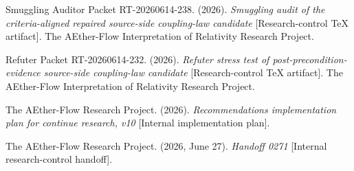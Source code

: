 \documentclass[11pt]{article}
\begin{document}
Smuggling Auditor Packet RT-20260614-238. (2026). \textit{Smuggling audit of
the criteria-aligned repaired source-side coupling-law candidate}
[Research-control TeX artifact]. The AEther-Flow Interpretation of Relativity
Research Project.

Refuter Packet RT-20260614-232. (2026). \textit{Refuter stress test of
post-precondition-evidence source-side coupling-law candidate}
[Research-control TeX artifact]. The AEther-Flow Interpretation of Relativity
Research Project.

The AEther-Flow Research Project. (2026). \textit{Recommendations
implementation plan for continue research, v10} [Internal implementation
plan].

The AEther-Flow Research Project. (2026, June 27). \textit{Handoff 0271}
[Internal research-control handoff].
\end{document}
